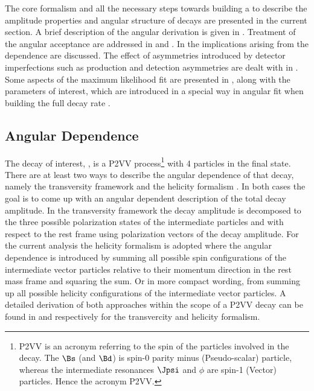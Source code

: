 
The core formalism and all the necessary steps towards building a \pdf to describe the amplitude properties and angular structure of \BJpsiKst decays are presented in
the current section. A brief description of the angular \pdf derivation is given in .
Treatment of the angular acceptance are addressed in  and .
In  the implications arising from the \mkpi dependence are discussed.
The effect of asymmetries introduced by detector imperfections such as production and detection asymmetries are dealt with
in . Some aspects of the maximum likelihood fit are presented in ,
along with the \ACP parameters of interest, which are introduced in a special way in angular fit when building the full decay rate \pdf.


\subsection{Angular Dependence}
\label{Diferential_Decay_Rate}
The decay of interest, \BJpsiKst, is a P2VV
process\footnote{P2VV is an acronym referring to the spin of the particles involved in the decay.
The $\Bs$ (and $\Bd$) is spin-0 parity minus (Pseudo-scalar) particle, whereas the intermediate resonances $\Jpsi$ and $\phi$
are spin-1 (Vector) particles. Hence the acronym P2VV.}
with 4 particles in the final state. There are at least two ways to describe the angular dependence of that decay, namely the transversity framework \cite{transvFrameworkI,transvFrameworkII}
and the helicity formalism \cite{helicityFormI,helicityFormII}. In both cases the goal is to come up with an angular dependent description of the total decay amplitude.
In the transversity framework the decay amplitude is decomposed to the three possible polarization states of the intermediate particles \Jpsi and \Kst with respect to
the \Bs rest frame using polarization vectors of the decay amplitude. For the current analysis the helicity formalism is adopted where the angular dependence is
introduced by summing all possible spin configurations of the intermediate vector particles relative to their momentum direction in the \Bs rest mass frame
and squaring the sum. Or in more compact wording, from summing up all possible helicity configurations of the intermediate vector particles. A detailed derivation of both
approaches within the scope of a P2VV decay can be found in \cite{daanThesis} and \cite{jeroenThesis} respectively for the transvercity and helicity formalism.

